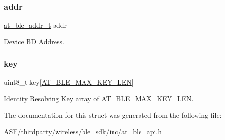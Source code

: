 \subsubsection{\texorpdfstring{addr}{addr}}
{\footnotesize\ttfamily \mbox{\hyperlink{structat__ble__addr__t}{at\+\_\+ble\+\_\+addr\+\_\+t}} addr}



Device BD Address. 

\mbox{\label{structat__ble___i_r_k__t_abdd5757e31504574b5dc0ee379bced9f}} 
\subsubsection{\texorpdfstring{key}{key}}
{\footnotesize\ttfamily uint8\+\_\+t key\mbox{[}\mbox{\hyperlink{at__ble__api_8h_a462eb50567c44d7284308fe058158e99}{A\+T\+\_\+\+B\+L\+E\+\_\+\+M\+A\+X\+\_\+\+K\+E\+Y\+\_\+\+L\+EN}}\mbox{]}}



Identity Resolving Key array of \mbox{\hyperlink{at__ble__api_8h_a462eb50567c44d7284308fe058158e99}{A\+T\+\_\+\+B\+L\+E\+\_\+\+M\+A\+X\+\_\+\+K\+E\+Y\+\_\+\+L\+EN}}. 



The documentation for this struct was generated from the following file\+:\begin{DoxyCompactItemize}
\item 
A\+S\+F/thirdparty/wireless/ble\+\_\+sdk/inc/\mbox{\hyperlink{at__ble__api_8h}{at\+\_\+ble\+\_\+api.\+h}}\end{DoxyCompactItemize}
